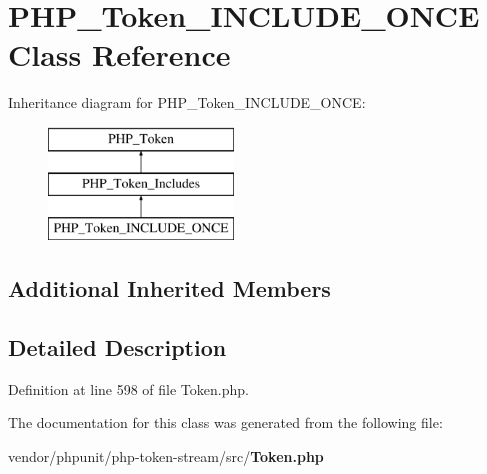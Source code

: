 \section{P\+H\+P\+\_\+\+Token\+\_\+\+I\+N\+C\+L\+U\+D\+E\+\_\+\+O\+N\+C\+E Class Reference}
\label{class_p_h_p___token___i_n_c_l_u_d_e___o_n_c_e}
Inheritance diagram for P\+H\+P\+\_\+\+Token\+\_\+\+I\+N\+C\+L\+U\+D\+E\+\_\+\+O\+N\+C\+E\+:\begin{figure}[H]
\begin{center}
\leavevmode
\includegraphics[height=3.000000cm]{class_p_h_p___token___i_n_c_l_u_d_e___o_n_c_e}
\end{center}
\end{figure}
\subsection*{Additional Inherited Members}


\subsection{Detailed Description}


Definition at line 598 of file Token.\+php.



The documentation for this class was generated from the following file\+:\begin{DoxyCompactItemize}
\item 
vendor/phpunit/php-\/token-\/stream/src/{\bf Token.\+php}\end{DoxyCompactItemize}
